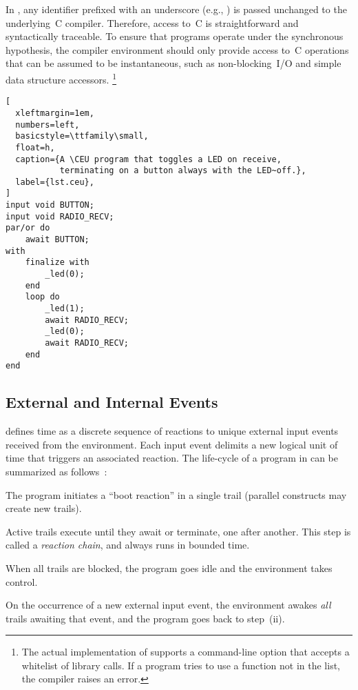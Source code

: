 In \CEU, any identifier prefixed with an underscore (e.g., ) is
passed unchanged to the underlying~C compiler.
%
Therefore, access to~C is straightforward and syntactically traceable.
%
To ensure that programs operate under the synchronous hypothesis, the compiler
environment should only provide access to~C operations that can be assumed to
be instantaneous, such as non-blocking~I/O and simple data structure accessors.%
\footnote {
The actual implementation of \CEU supports a command-line option that accepts a
whitelist of library calls.
If a program tries to use a function not in the list, the compiler raises an
error.
}

\begin{lstlisting}[
  xleftmargin=1em,
  numbers=left,
  basicstyle=\ttfamily\small,
  float=h,
  caption={A \CEU program that toggles a LED on receive,
           terminating on a button always with the LED~off.},
  label={lst.ceu},
]
input void BUTTON;
input void RADIO_RECV;
par/or do
    await BUTTON;
with
    finalize with
        _led(0);
    end
    loop do
        _led(1);
        await RADIO_RECV;
        _led(0);
        await RADIO_RECV;
    end
end
\end{lstlisting}

\subsection{External and Internal Events}
\label{sec.ceu.evts}

\CEU defines time as a discrete sequence of reactions to unique external
input events received from the environment.
%
Each input event delimits a new logical unit of time that triggers an
associated reaction.
%
The life-cycle of a program in \CEU can be summarized as
follows~\cite{ceu.sensys13}:
%
\begin{enumerate:i}
\item The program initiates a ``boot reaction'' in a single trail (parallel
      constructs may create new trails).
\item Active trails execute until they await or terminate, one after
      another.  This step is called a \emph{reaction chain}, and always runs in
      bounded time.
\item When all trails are blocked, the program goes idle and the environment
      takes control.
\item On the occurrence of a new external input event, the environment
      awakes \emph{all} trails awaiting that event, and the program goes back to
      step~(ii).
\end{enumerate:i}

